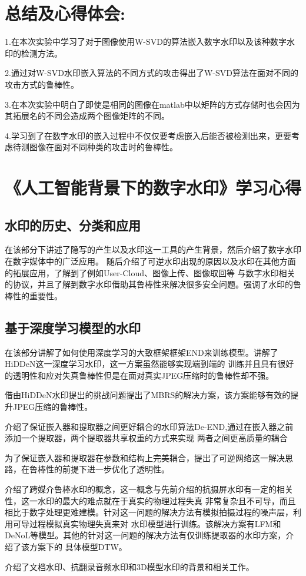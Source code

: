 \documentclass[a4paper,11pt,UTF8]{ctexart}
\begin{document}
\section{总结及心得体会:}
  1.在本次实验中学习了对于图像使用W-SVD的算法嵌入数字水印以及该种数字水印的检测方法。\par
  2.通过对W-SVD水印嵌入算法的不同方式的攻击得出了W-SVD算法在面对不同的攻击方式的鲁棒性。\par
  3.在本次实验中明白了即使是相同的图像在matlab中以矩阵的方式存储时也会因为其拓展名的不同会造成两个图像矩阵的不同。\par
  4.学习到了在数字水印的嵌入过程中不仅仅要考虑嵌入后能否被检测出来，更要考虑待测图像在面对不同种类的攻击时的鲁棒性。\par
\newpage
\section{《人工智能背景下的数字水印》学习心得}
  \subsection{水印的历史、分类和应用}
    在该部分下讲述了隐写的产生以及水印这一工具的产生背景，然后介绍了数字水印在数字媒体中的广泛应用。
    随后介绍了可逆水印出现的原因以及水印在其他方面的拓展应用，了解到了例如User-Cloud、图像上传、图像取回等
    与数字水印相关的协议，并且了解到数字水印借助其鲁棒性来解决很多安全问题。强调了水印的鲁棒性的重要性。
  \subsection{基于深度学习模型的水印}
    在该部分讲解了如何使用深度学习的大致框架框架END来训练模型。讲解了HiDDeN这一深度学习水印，这一方案虽然能够实现端到端的
    训练并且具有很好的透明性和应对失真鲁棒性但是在面对真实JPEG压缩时的鲁棒性却不强。\par
    借由HiDDeN水印提出的挑战问题提出了MBRS的解决方案，该方案能够有效的提升JPEG压缩的鲁棒性。\par
    介绍了保证嵌入器和提取器之间更好耦合的水印算法De-END,通过在嵌入器之前添加一个提取器，两个提取器共享权重的方式来实现
    两者之间更高质量的耦合\par
    为了保证嵌入器和提取器在参数和结构上完美耦合，提出了可逆网络这一解决思路，在鲁棒性的前提下进一步优化了透明性。\par
    介绍了跨媒介鲁棒水印的概念，这一概念与先前介绍的抗摄屏水印有一定的相关性，这一水印的最大的难点就在于真实的物理过程失真
    非常复杂且不可导，而且相比于数字处理更难建模。针对这一问题的解决方法有模拟拍摄过程的噪声层，利用可导过程模拟真实物理失真来对
    水印模型进行训练。该解决方案有LFM和DeNoL等模型。其他的针对这一问题的解决方法有仅训练提取器的水印方案，介绍了该方案下的
    具体模型DTW。\par
    介绍了文档水印、抗翻录音频水印和3D模型水印的背景和相关工作。
\end{document}

